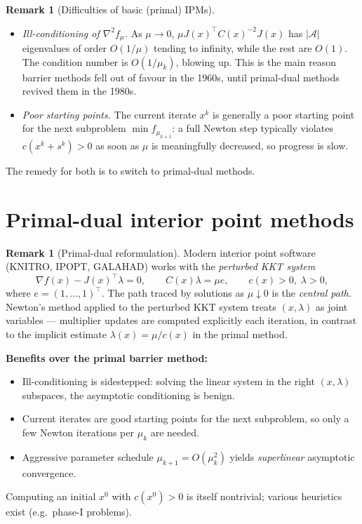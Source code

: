 \documentclass[11pt,a4paper]{report}
\theoremstyle{plain}
\theoremstyle{definition}
\newtheorem{remark}[theorem]{Remark}
\newcommand{\grad}{\nabla}
\newcommand{\hess}{\nabla^{2}}
\newcommand{\trans}{^{\top}}
\begin{document}
\begin{remark}[Difficulties of basic (primal) IPMs]\label{rem:ipm-difficulties}\
\begin{itemize}[leftmargin=2em,itemsep=0pt]
  \item \emph{Ill-conditioning of $\hess f_{\mu}$.} As $\mu\to 0$,
        $\mu J(x)\trans C(x)^{-2}J(x)$ has $|\mathcal{A}|$ eigenvalues of order
        $O(1/\mu)$ tending to infinity, while the rest are $O(1)$. The condition
        number is $O(1/\mu_{k})$, blowing up. This is the main reason barrier
        methods fell out of favour in the 1960s, until primal-dual methods
        revived them in the 1980s.
  \item \emph{Poor starting points.} The current iterate $x^{k}$ is generally a
        poor starting point for the next subproblem $\min f_{\mu_{k+1}}$: a full
        Newton step typically violates $c(x^{k}+s^{k})>0$ as soon as $\mu$ is
        meaningfully decreased, so progress is slow.
\end{itemize}
The remedy for both is to switch to primal-dual methods.
\end{remark}

\section{Primal-dual interior point methods}

\begin{remark}[Primal-dual reformulation]
Modern interior point software (KNITRO, IPOPT, GALAHAD) works with the
\emph{perturbed KKT system}
\[
\grad f(x)-J(x)\trans\lambda=0,\qquad C(x)\lambda=\mu e,\qquad c(x)>0,\;\lambda>0,
\]
where $e=(1,\dots,1)\trans$. The path traced by solutions as $\mu\downarrow 0$ is
the \emph{central path}. Newton's method applied to the perturbed KKT system
treats $(x,\lambda)$ as joint variables — multiplier updates are computed
explicitly each iteration, in contrast to the implicit estimate
$\lambda(x)=\mu/c(x)$ in the primal method.

\textbf{Benefits over the primal barrier method:}
\begin{itemize}[leftmargin=2em,itemsep=0pt]
  \item Ill-conditioning is sidestepped: solving the linear system in the right
        $(x,\lambda)$ subspaces, the asymptotic conditioning is benign.
  \item Current iterates are good starting points for the next subproblem, so
        only a few Newton iterations per $\mu_{k}$ are needed.
  \item Aggressive parameter schedule $\mu_{k+1}=O(\mu_{k}^{2})$ yields
        \emph{superlinear} asymptotic convergence.
\end{itemize}
Computing an initial $x^{0}$ with $c(x^{0})>0$ is itself nontrivial; various
heuristics exist (e.g.\ phase-I problems).
\end{remark}
\end{document}
